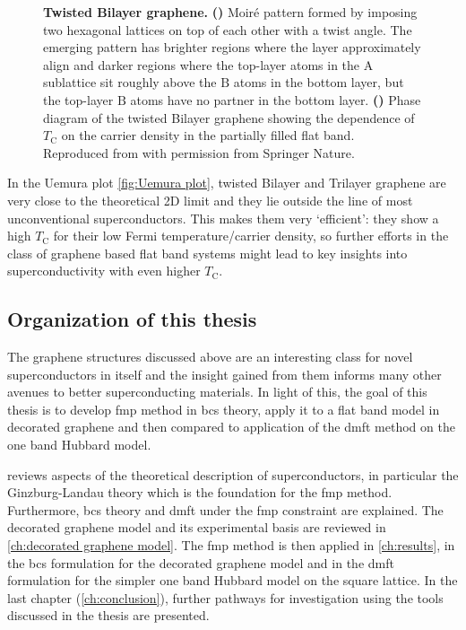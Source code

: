 \documentclass[../notes.tex]{subfiles}
\begin{document}
\begin{figure}
\begin{subfigure}[b]{0.5\textwidth}
	\end{subfigure}%
	\caption[Twisted Bilayer graphene.]{
		\textbf{Twisted Bilayer graphene.} \textbf{()} Moiré pattern formed by imposing two hexagonal lattices on top of each other with a twist angle. The emerging pattern has brighter regions where the layer approximately align and darker regions where the top-layer atoms in the \(\mathrm{A}\) sublattice sit roughly above the \(\mathrm{B}\) atoms in the bottom layer, but the top-layer \(\mathrm{B}\) atoms have no partner in the bottom layer.
		\textbf{()} Phase diagram of the twisted Bilayer graphene showing the dependence of \(T_{\mathrm{C}}\) on the carrier density in the partially filled flat band.
		Reproduced from \cite{caoUnconventionalSuperconductivityMagicangle2018} with permission from Springer Nature.
	}
\end{figure}

In the Uemura plot \cref{fig:Uemura plot}, twisted Bilayer and Trilayer graphene are very close to the theoretical 2D limit  and they lie outside the line of most unconventional superconductors.
This makes them very `efficient': they show a high \(T_{\mathrm{C}}\) for their low Fermi temperature/carrier density, so further efforts in the class of graphene based flat band systems might lead to key insights into superconductivity with even higher \(T_{\mathrm{C}}\).

\subsection*{Organization of this thesis}

The graphene structures discussed above are an interesting class for novel superconductors in itself and the insight gained from them informs many other avenues to better superconducting materials.
In light of this, the goal of this thesis is to develop \gls{fmp} method in \gls{bcs} theory, apply it to a flat band model in decorated graphene and then compared to application of the \gls{dmft} method on the one band Hubbard model.

 reviews aspects of the theoretical description of superconductors, in particular the Ginzburg-Landau theory which is the foundation for the \gls{fmp} method.
Furthermore, \gls{bcs} theory and \gls{dmft} under the \gls{fmp} constraint are explained.
The decorated graphene model and its experimental basis are reviewed in \cref{ch:decorated graphene model}.
The \gls{fmp} method is then applied in \cref{ch:results}, in the \gls{bcs} formulation for the decorated graphene model and in the \gls{dmft} formulation for the simpler one band Hubbard model on the square lattice.
In the last chapter (\cref{ch:conclusion}), further pathways for investigation using the tools discussed in the thesis are presented.
\end{document}
